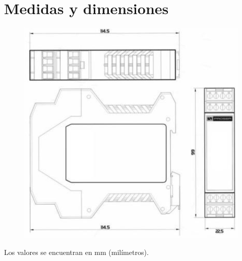 \section{Medidas y dimensiones}
\begin{figure}[!htb]
	\centering
	\includegraphics[width=\textwidth , keepaspectratio]{Figures/ApendixA/medidas.png}
	\label{fig:ADEfuncbloc}
\end{figure}

Los valores se encuentran en mm  (milímetros).